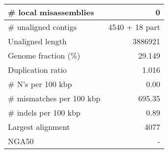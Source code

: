 \documentclass[12pt,a4paper]{article}
\begin{document}
\begin{table}[ht]
\begin{center}
\begin{tabular}{|l*{1}{|r}|}
\# local misassemblies & 0 \\ \hline
\# unaligned contigs & 4540 + 18 part \\ \hline
Unaligned length & 3886921 \\ \hline
Genome fraction (\%) & 29.149 \\ \hline
Duplication ratio & 1.016 \\ \hline
\# N's per 100 kbp & 0.00 \\ \hline
\# mismatches per 100 kbp & 695.35 \\ \hline
\# indels per 100 kbp & 0.89 \\ \hline
Largest alignment & 4077 \\ \hline
NGA50 & - \\ \hline
\end{tabular}
\end{center}
\end{table}
\end{document}
